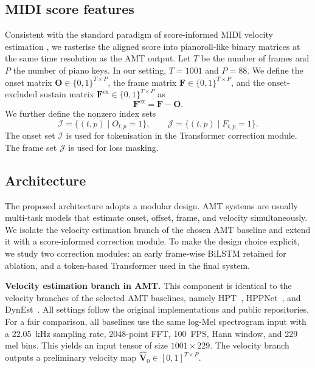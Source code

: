 \subsection{MIDI score features}
\label{sec:scoreinf:features}

Consistent with the standard paradigm of score-informed MIDI velocity estimation \cite{kim2024method}, we rasterise the aligned score into pianoroll-like binary matrices at the same time resolution as the AMT output. Let $T$ be the number of frames and $P$ the number of piano keys. In our setting, $T=1001$ and $P=88$. We define the onset matrix $\mathbf{O}\in\{0,1\}^{T\times P}$, the frame matrix $\mathbf{F}\in\{0,1\}^{T\times P}$, and the onset-excluded sustain matrix $\mathbf{F}^{\mathrm{ex}}\in\{0,1\}^{T\times P}$ as
\begin{equation}
\mathbf{F}^{\mathrm{ex}} = \mathbf{F} - \mathbf{O}.
\label{eq:scoreinf:fex}
\end{equation}
We further define the nonzero index sets
\begin{equation}
\mathcal{I} = \{(t,p)\mid O_{t,p}=1\},
\qquad
\mathcal{J} = \{(t,p)\mid F_{t,p}=1\}.
\label{eq:scoreinf:index}
\end{equation}
The onset set $\mathcal{I}$ is used for tokenisation in the Transformer correction module. The frame set $\mathcal{J}$ is used for loss masking.

\subsection{Architecture}
\label{sec:scoreinf:arch}

The proposed architecture adopts a modular design. AMT systems are usually multi-task models that estimate onset, offset, frame, and velocity simultaneously. We isolate the velocity estimation branch of the chosen AMT baseline and extend it with a score-informed correction module. To make the design choice explicit, we study two correction modules: an early frame-wise BiLSTM retained for ablation, and a token-based Transformer used in the final system.

\textbf{Velocity estimation branch in AMT.} This component is identical to the velocity branches of the selected AMT baselines, namely HPT~\cite{kong2021hpt}, HPPNet~\cite{wei2022hppnet}, and DynEst~\cite{he2026dynest}. All settings follow the original implementations and public repositories. For a fair comparison, all baselines use the same log-Mel spectrogram input with a 22.05~kHz sampling rate, 2048-point FFT, 100~FPS, Hann window, and 229 mel bins. This yields an input tensor of size $1001\times229$. The velocity branch outputs a preliminary velocity map $\hat{\mathbf{V}}_0\in[0,1]^{T\times P}$.

